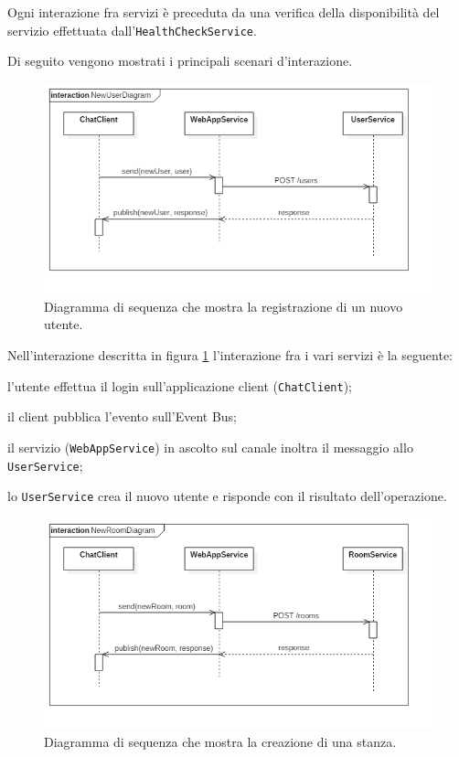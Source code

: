 \documentclass[a4paper]{article}
\begin{document}
Ogni interazione fra servizi è preceduta da una verifica della disponibilità del servizio effettuata dall'\texttt{HealthCheckService}.

Di seguito vengono mostrati i principali scenari d'interazione.

\begin{figure}[H]
    \centering
    \includegraphics[width=\linewidth, height=\textheight, keepaspectratio]{res/NewUserDiagram.png}
    \caption{Diagramma di sequenza che mostra la registrazione di un nuovo utente.}
    \label{fig:new-user-diagram}
\end{figure}

Nell'interazione descritta in figura \ref{fig:new-user-diagram} l'interazione fra i vari servizi è la seguente:
\begin{enumerate*}[label=(\arabic*)]
%
    \item l'utente effettua il login sull'applicazione client (\texttt{ChatClient});
%
    \item il client pubblica l'evento sull'Event Bus;
%
    \item il servizio (\texttt{WebAppService}) in ascolto sul canale inoltra il messaggio allo \texttt{UserService};
%
    \item lo \texttt{UserService} crea il nuovo utente e risponde con il risultato dell'operazione.
\end{enumerate*}

\begin{figure}[H]
    \centering
    \includegraphics[width=\linewidth, height=\textheight, keepaspectratio]{res/NewRoomDiagram.png}
        \caption{Diagramma di sequenza che mostra la creazione di una stanza.}
    \label{fig:new-room-diagram}
\end{figure}
\end{document}
